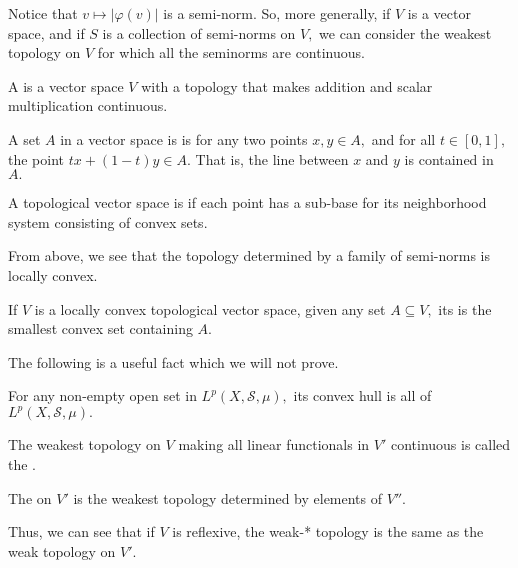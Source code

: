 \noindent Notice that $v\mapsto|\varphi(v)|$ is a semi-norm. So, more generally, if $V$ is a vector space, and if $S$ is a collection of semi-norms on $V,$ we can consider the weakest topology on $V$ for which all the seminorms are continuous. \\

\begin{defn}
A  is a vector space $V$ with a topology that makes addition and scalar multiplication continuous.
\end{defn}

\begin{defn}
A set $A$ in a vector space is  is for any two points $x,y\in A,$ and for all $t\in[0,1],$ the point $tx+(1-t)y\in A.$ That is, the line between $x$ and $y$ is contained in $A.$
\end{defn}

\begin{defn}
A topological vector space is  if each point has a sub-base for its neighborhood system consisting of convex sets.
\end{defn}

\noindent From above, we see that the topology determined by a family of semi-norms is locally convex.

\begin{defn}
If $V$ is a locally convex topological vector space, given any set $A\subseteq V,$ its  is the smallest convex set containing $A.$
\end{defn}

\noindent The following is a useful fact which we will not prove.

\begin{prop}
For any non-empty open set in $L^p(X,\mathcal{S},\mu),$ its convex hull is all of $L^p(X,\mathcal{S},\mu).$
\end{prop}

\begin{defn}
The weakest topology on $V$ making all linear functionals in $V'$ continuous is called the .
\end{defn}

\begin{defn}
The  on $V'$ is the weakest topology determined by elements of $V''.$
\end{defn}

\noindent Thus, we can see that if $V$ is reflexive, the weak-* topology is the same as the weak topology on $V'.$


